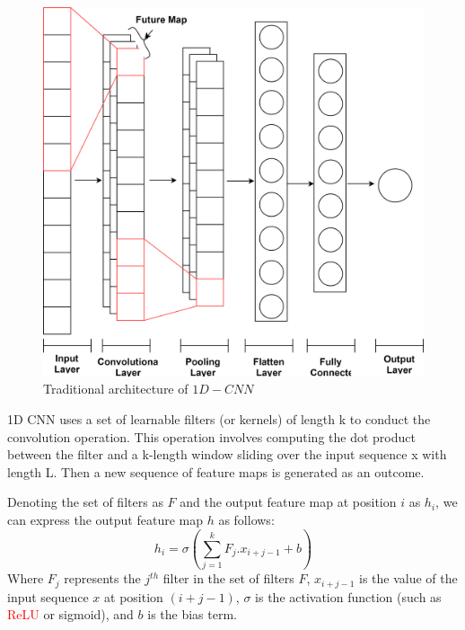 \documentclass[a4paper, fleqn]{cas-sc}
\theoremstyle{definition}
\theoremstyle{remark}
\begin{document}
\begin{figure}[h!]
  \centering
    \includegraphics[scale=.5]{cnn}
    \caption{Traditional architecture of $1D-CNN$}\label{CNN}
\end{figure}

1D CNN uses a set of learnable filters (or kernels) of length k to conduct the convolution operation. This operation involves computing the dot product between the filter and a k-length window sliding over the input sequence x with length L. Then a new sequence of feature maps is generated as an outcome.

Denoting the set of filters as $F$ and the output feature map at position $i$ as $h_i$,  we can express the output feature map $h$ as follows: 
\begin{equation}\label{equ: cnn}
        h_i = \sigma \left (\sum_{j=1}^{k}F_{j}.x_{i+j-1}+b \right)
\end{equation}
Where $F_j$ represents the $j^{th}$ filter in the set of filters $F$,  $x_{i+j-1}$ is the value of the input sequence $x$ at position $(i+j-1)$,  $\sigma$ is the activation function (such as \textcolor{red}{ReLU} or sigmoid),  and $b$ is the bias term.
\end{document}
